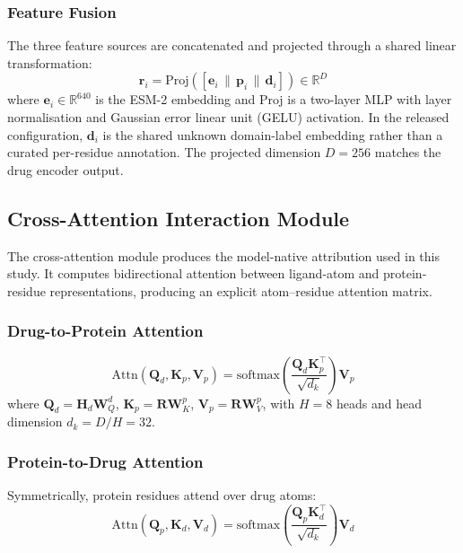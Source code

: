 \documentclass[fleqn,10pt]{wlscirep}
\begin{document}
\subsubsection{Feature Fusion}

The three feature sources are concatenated and projected through a shared linear
transformation:
\begin{equation}
\mathbf{r}_i = \mathrm{Proj}\!\left(
  [\mathbf{e}_i \,\|\, \mathbf{p}_i \,\|\, \mathbf{d}_i]
\right) \in \mathbb{R}^{D}
\end{equation}
where $\mathbf{e}_i \in \mathbb{R}^{640}$ is the ESM-2 embedding and Proj is a
two-layer MLP with layer normalisation and Gaussian error linear unit (GELU)
activation. In the released configuration, $\mathbf{d}_i$ is the shared unknown
domain-label embedding rather than a curated per-residue annotation. The projected
dimension $D=256$ matches the drug encoder output.

\subsection{Cross-Attention Interaction Module}

\begingroup\color{red}The cross-attention module produces the model-native
attribution used in this study. It computes bidirectional attention between
ligand-atom and protein-residue representations, producing an explicit
atom--residue attention matrix.\endgroup

\subsubsection{Drug-to-Protein Attention}

\begin{equation}
\mathrm{Attn}(\mathbf{Q}_d,\mathbf{K}_p,\mathbf{V}_p) =
  \mathrm{softmax}\!\left(\frac{\mathbf{Q}_d\mathbf{K}_p^\top}{\sqrt{d_k}}\right)
  \mathbf{V}_p
\end{equation}
where $\mathbf{Q}_d = \mathbf{H}_d\mathbf{W}_Q^d$,
$\mathbf{K}_p = \mathbf{R}\mathbf{W}_K^p$,
$\mathbf{V}_p = \mathbf{R}\mathbf{W}_V^p$, with $H=8$ heads and head
dimension $d_k = D/H = 32$.

\subsubsection{Protein-to-Drug Attention}

Symmetrically, protein residues attend over drug atoms:
\begin{equation}
\mathrm{Attn}(\mathbf{Q}_p,\mathbf{K}_d,\mathbf{V}_d) =
  \mathrm{softmax}\!\left(\frac{\mathbf{Q}_p\mathbf{K}_d^\top}{\sqrt{d_k}}\right)
  \mathbf{V}_d
\end{equation}
\end{document}
